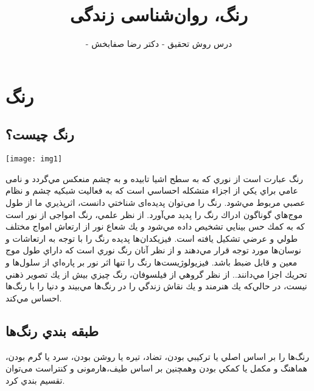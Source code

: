 \documentclass[12pt]{report}
\begin{document}
\def\listfigurename{فهرست اشکال}
\def\listtablename{فهرست جداول}
\def\bibname{\rl{مراجع}}

\title{
\color {orange}
رنگ، روان‌شناسی زندگی
}

\author{
		 
\small
- درس روش تحقیق - دکتر رضا صفابخش
}



\makeatletter

\makeatother
\thispagestyle{empty}
\newpage


\maketitle


\tableofcontents


\part{رنگ}

\chapter{رنگ چيست؟}
\begin{center}
	\texttt{[image: img1]}
\end{center}
رنگ عبارت است از نوري كه به سطح اشيا تابيده و به چشم منعكس مي‌گردد و نامی عامي براي يكي از اجزاء متشكله احساسي است كه به فعاليت شبكيه چشم و نظام عصبي مربوط مي‌شود.
رنگ را می‌توان پدیده‌ای شناختي دانست، اثرپذيري ما از طول موج‌هاي گوناگون ادراك رنگ را پديد مي‌آورد.
از نظر علمي، رنگ امواجی از نور است كه به كمك حس بينايي تشخيص داده مي‌شود و يك شعاع نور از ارتعاش امواج مختلف طولي و عرضي تشكيل يافته است. 
فيزيكدان‌ها پديده رنگ را با توجه به ارتعاشات و نوسان‌ها مورد توجه قرار مي‌دهند و از نظر آنان رنگ نوري است که داراي طول موج معين و قابل ضبط باشد. 
فيزيولوژيست‌ها رنگ را تنها اثر نور بر پاره‌اي از سلول‌ها و تحريك اجزا مي‌دانند.. 
از نظر گروهي از فيلسوفان، رنگ چيزي بيش از يك تصوير ذهني نيست، در حالي‌كه يك هنرمند و يك نقاش زندگي را در رنگ‌ها مي‌بيند و دنيا را با رنگ‌ها احساس مي‌كند.

\newpage

\chapter{طبقه بندي رنگ‌ها}
رنگ‌ها را بر اساس اصلي یا تركيبي بودن، تضاد، تيره یا روشن بودن،  سرد یا گرم بودن،  هماهنگ و مكمل یا كمكي بودن وهمچنین بر اساس طیف،‌هارمونی و کنتراست می‌توان تقسيم بندي كرد.
\end{document}
